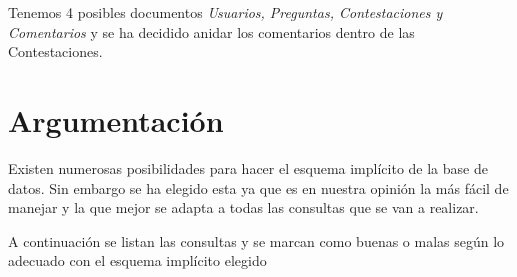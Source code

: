 \documentclass{article}
\begin{document}
    \par
    Tenemos 4 posibles documentos \emph{Usuarios, Preguntas, Contestaciones y Comentarios}
    y se ha decidido anidar los comentarios dentro de las Contestaciones. 

  \section{Argumentación}
    Existen numerosas posibilidades para hacer el esquema implícito de la base de datos.
    Sin embargo se ha elegido esta ya que es en nuestra opinión la más fácil de manejar y
    la que mejor se adapta a todas las consultas que se van a realizar.
    \par
    A continuación se listan las consultas y se marcan como buenas o malas según lo adecuado
    con el esquema implícito elegido
    \par
\end{document}
